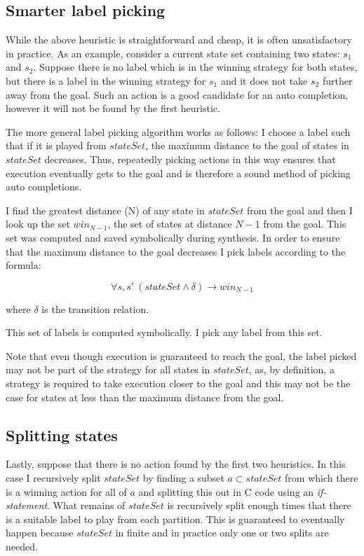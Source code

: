 \subsection{Smarter label picking}

While the above heuristic is straightforward and cheap, it is often unsatisfactory in practice. As an example, consider a current state set containing two states: $s_1$ and $s_2$. Suppose there is no label which is in the winning strategy for both states, but there is a label in the winning strategy for $s_1$ and it does not take $s_2$ further away from the goal. Such an action is a good candidate for an auto completion, however it will not be found by the first heuristic.

The more general label picking algorithm works as follows: I choose a label such that if it is played from $stateSet$, the maximum distance to the goal of states in $stateSet$ decreases. Thus, repeatedly picking actions in this way ensures that execution eventually gets to the goal and is therefore a sound method of picking auto completions. 

I find the greatest distance (N) of any state in $stateSet$ from the goal and then I look up the set $win_{N-1}$, the set of states at distance $N-1$ from the goal. This set was computed and saved symbolically during synthesis. In order to ensure that the maximum distance to the goal decreases I pick labels according to the formula:

\begin{equation}
    \forall s, s' \: (stateSet \land \delta) \rightarrow win_{N-1}
\end{equation}

\noindent where $\delta$ is the transition relation.

This set of labels is computed symbolically. I pick any label from this set.

Note that even though execution is guaranteed to reach the goal, the label picked may not be part of the strategy for all states in $stateSet$, as, by definition, a strategy is required to take execution closer to the goal and this may not be the case for states at less than the maximum distance from the goal.

\subsection{Splitting states}

Lastly, suppose that there is no action found by the first two heuristics. In this case I recursively split $stateSet$ by finding a subset $a \subset stateSet$ from which there is a winning action for all of $a$ and splitting this out in C code using an \emph{if-statement}. What remains of $stateSet$ is recursively split enough times that there is a suitable label to play from each partition. This is guaranteed to eventually happen because $stateSet$ in finite and in practice only one or two splits are needed.

